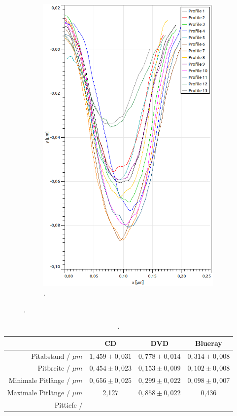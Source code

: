 \begin{figure}[H]
\begin{subfigure}[t]{0.3\textwidth}
	\includegraphics[width=\textwidth]{AFM_auswertung/bluray_tiefe_grafik.png}
	\caption{.}
	\label{abb:}
	\end{subfigure}
\caption{.}
\label{abb:pit_tiefe}
\end{figure}


\begin{table}
	\centering
	\caption{.}
\begin{tabular}{|r|ccc|}
	\hline
	{} & {CD} & {DVD} & {Blueray} \\
	\hline
	Pitabstand / $\mu m$ & $1,459 \pm 0,031$ & $0,778 \pm 0,014$ & $0,314 \pm 0,008$ \\
	Pitbreite	/ $\mu m$ &	$0,454 \pm 0,023$ & $0,153 \pm 0,009$ & $0,102 \pm 0,008$ \\
	Minimale Pitlänge / $\mu m$ & $0,656 \pm 0,025$ & $0,299 \pm 0,022$ & $0,098 \pm 0,007$ \\
	Maximale Pitlänge / $\mu m$ & 2,127 & $0,858 \pm 0,022$ & 0,436 \\
	Pittiefe /  &  &  &  \\
	\hline
\end{tabular}
\label{tab:auf2}
\end{table}


